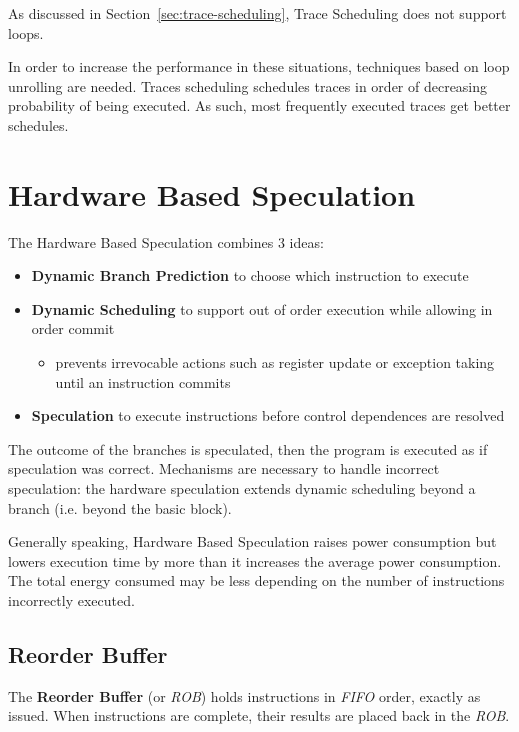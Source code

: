 \documentclass[english]{article}
\begin{document}
As discussed in Section~\ref{sec:trace-scheduling}, Trace Scheduling does not support loops.

In order to increase the performance in these situations, techniques based on loop unrolling are needed.
Traces scheduling schedules traces in order of decreasing probability of being executed.
As such, most frequently executed traces get better schedules.

\newpage

\section{Hardware Based Speculation}

The Hardware Based Speculation combines 3 ideas:

\begin{itemize}
  \item \textbf{Dynamic Branch Prediction} to choose which instruction to execute
  \item \textbf{Dynamic Scheduling} to support out of order execution while allowing in order commit
        \begin{itemize}
          \item prevents irrevocable actions such as register update or exception taking until an instruction commits
        \end{itemize}
  \item \textbf{Speculation} to execute instructions before control dependences are resolved
\end{itemize}

The outcome of the branches is speculated, then the program is executed as if speculation was correct.
Mechanisms are necessary to handle incorrect speculation: the hardware speculation extends dynamic scheduling beyond a branch (i.e. beyond the basic block).

\bigskip
Generally speaking, Hardware Based Speculation raises power consumption but lowers execution time by more than it increases the average power consumption.
The total energy consumed may be less depending on the number of instructions incorrectly executed.

\subsection{Reorder Buffer}

The \textbf{Reorder Buffer} (or \textit{ROB}) holds instructions in \textit{FIFO} order, exactly as issued.
When instructions are complete, their results are placed back in the \textit{ROB}.
\end{document}
